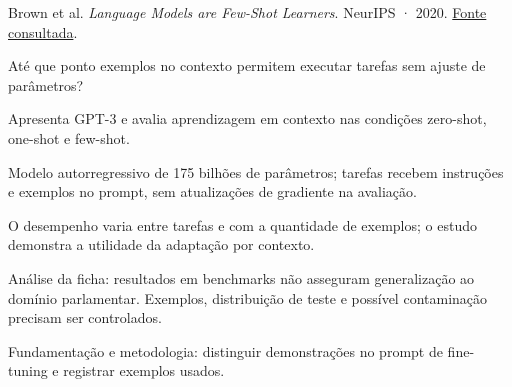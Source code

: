 {\small Brown et al. \textit{Language Models are Few-Shot Learners}. NeurIPS · 2020. \href{https://proceedings.neurips.cc/paper/2020/file/1457c0d6bfcb4967418bfb8ac142f64a-Paper.pdf}{Fonte consultada}.\par}

Até que ponto exemplos no contexto permitem executar tarefas sem ajuste de parâmetros?

Apresenta GPT-3 e avalia aprendizagem em contexto nas condições zero-shot, one-shot e few-shot.

Modelo autorregressivo de 175 bilhões de parâmetros; tarefas recebem instruções e exemplos no prompt, sem atualizações de gradiente na avaliação.

O desempenho varia entre tarefas e com a quantidade de exemplos; o estudo demonstra a utilidade da adaptação por contexto.

\begin{itemize}
\end{itemize}

Análise da ficha: resultados em benchmarks não asseguram generalização ao domínio parlamentar. Exemplos, distribuição de teste e possível contaminação precisam ser controlados.

Fundamentação e metodologia: distinguir demonstrações no prompt de fine-tuning e registrar exemplos usados.

